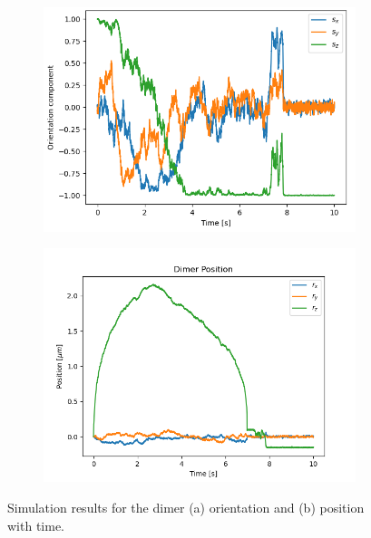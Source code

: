 \documentclass[final,  3p]{elsarticle}
\begin{document}
\begin{figure}[h]
\centering
\begin{subfigure}{0.45\textwidth}
	\subcaption{}
	\includegraphics[width =\textwidth]{./Images/fig5a.png}
\end{subfigure}
\begin{subfigure}{0.45\textwidth}
	\subcaption{}
	\includegraphics[width=\textwidth]{./Images/fig5b.png}
\end{subfigure}
\caption{\label{fig:motion}
%
Simulation results for the dimer (a) orientation and
(b) position with time.
%
}
\end{figure}
\end{document}

